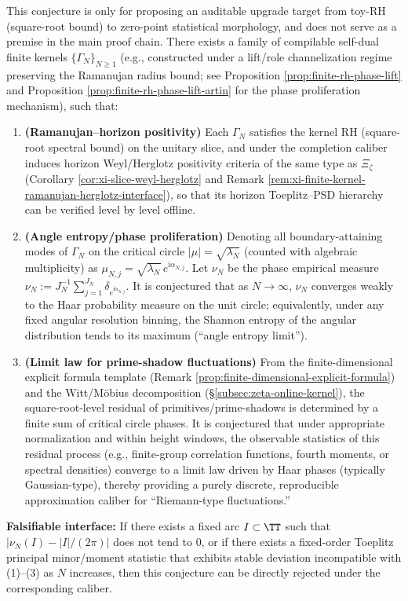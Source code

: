 \begin{conjecture}\label{conj:discussion-horizon-angle-entropy}
This conjecture is only for proposing an auditable upgrade target from toy-RH (square-root bound) to zero-point statistical morphology, and does not serve as a premise in the main proof chain.
There exists a family of compilable self-dual finite kernels \(\{\Gamma_N\}_{N\ge 1}\) (e.g., constructed under a lift/role channelization regime preserving the Ramanujan radius bound; see Proposition \ref{prop:finite-rh-phase-lift} and Proposition \ref{prop:finite-rh-phase-lift-artin} for the phase proliferation mechanism), such that:
\begin{enumerate}
  \item \textbf{(Ramanujan--horizon positivity)}
  Each \(\Gamma_N\) satisfies the kernel RH (square-root spectral bound) on the unitary slice, and under the completion caliber induces horizon Weyl/Herglotz positivity criteria of the same type as \(\Xi_\zeta\) (Corollary \ref{cor:xi-slice-weyl-herglotz} and Remark \ref{rem:xi-finite-kernel-ramanujan-herglotz-interface}), so that its horizon Toeplitz--PSD hierarchy can be verified level by level offline.
  \item \textbf{(Angle entropy/phase proliferation)}
  Denoting all boundary-attaining modes of \(\Gamma_N\) on the critical circle \(|\mu|=\sqrt{\lambda_N}\) (counted with algebraic multiplicity) as
  \(
  \mu_{N,j}=\sqrt{\lambda_N}\,e^{\mathrm{i}\alpha_{N,j}}
  \).
  Let \(\nu_N\) be the phase empirical measure
  \(
  \nu_N:=J_N^{-1}\sum_{j=1}^{J_N}\delta_{e^{\mathrm{i}\alpha_{N,j}}}
  \).
  It is conjectured that as \(N\to\infty\), \(\nu_N\) converges weakly to the Haar probability measure on the unit circle; equivalently, under any fixed angular resolution binning, the Shannon entropy of the angular distribution tends to its maximum (``angle entropy limit'').
  \item \textbf{(Limit law for prime-shadow fluctuations)}
  From the finite-dimensional explicit formula template (Remark \ref{prop:finite-dimensional-explicit-formula}) and the Witt/M\"obius decomposition (\S\ref{subsec:zeta-online-kernel}), the square-root-level residual of primitives/prime-shadows is determined by a finite sum of critical circle phases.
  It is conjectured that under appropriate normalization and within height windows, the observable statistics of this residual process (e.g., finite-group correlation functions, fourth moments, or spectral densities) converge to a limit law driven by Haar phases (typically Gaussian-type), thereby providing a purely discrete, reproducible approximation caliber for ``Riemann-type fluctuations.''
\end{enumerate}
\textbf{Falsifiable interface:} If there exists a fixed arc \(I\subset\TT\) such that
\(
|\nu_N(I)-|I|/(2\pi)|
\)
does not tend to \(0\), or if there exists a fixed-order Toeplitz principal minor/moment statistic that exhibits stable deviation incompatible with (1)--(3) as \(N\) increases, then this conjecture can be directly rejected under the corresponding caliber.
\end{conjecture}

